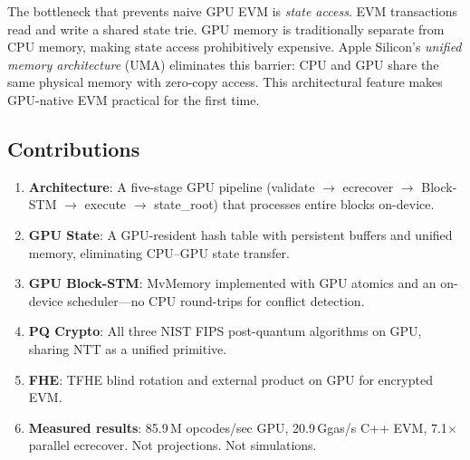 The bottleneck that prevents naive GPU EVM is \emph{state access}. EVM transactions read
and write a shared state trie. GPU memory is traditionally separate from CPU memory,
making state access prohibitively expensive. Apple Silicon's \emph{unified memory
architecture} (UMA) eliminates this barrier: CPU and GPU share the same physical memory
with zero-copy access. This architectural feature makes GPU-native EVM practical for the
first time.

\subsection{Contributions}

\begin{enumerate}
\item \textbf{Architecture}: A five-stage GPU pipeline (validate $\to$ ecrecover $\to$
      Block-STM $\to$ execute $\to$ state\_root) that processes entire blocks on-device.
\item \textbf{GPU State}: A GPU-resident hash table with persistent buffers and
      unified memory, eliminating CPU--GPU state transfer.
\item \textbf{GPU Block-STM}: MvMemory implemented with GPU atomics and an on-device
      scheduler---no CPU round-trips for conflict detection.
\item \textbf{PQ Crypto}: All three NIST FIPS post-quantum algorithms on GPU, sharing
      NTT as a unified primitive.
\item \textbf{FHE}: TFHE blind rotation and external product on GPU for encrypted EVM.
\item \textbf{Measured results}: 85.9\,M opcodes/sec GPU, 20.9\,Ggas/s C++ EVM,
      7.1$\times$ parallel ecrecover. Not projections. Not simulations.
\end{enumerate}

